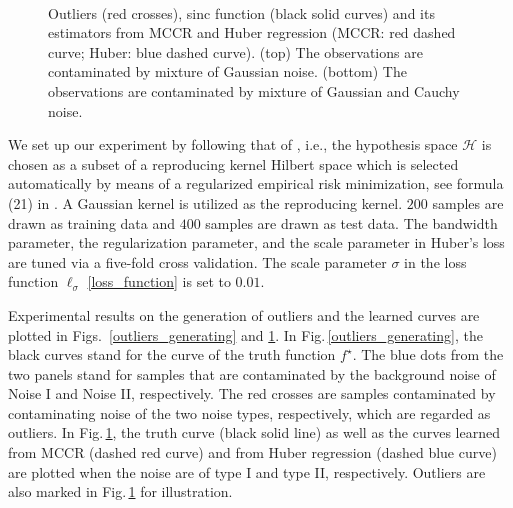 \documentclass[11pt]{article}
\begin{document}
\begin{figure}[!htb]
	\centering
	\begin{minipage}[b]{1\textwidth}
		\centering
		
	\end{minipage}%
	\\
	\medskip 
	\begin{minipage}[b]{1\textwidth}
		\centering
		
	\end{minipage}%
	\caption{Outliers (red crosses), sinc function (black solid curves) and its estimators from MCCR and Huber regression (MCCR: red  dashed curve; Huber: blue dashed curve). (top) The observations are contaminated by mixture of Gaussian noise. (bottom) The observations are contaminated by mixture of Gaussian and Cauchy noise.}
	\label{fitting_result}
\end{figure} 

 

We set up our experiment by following that of \cite{fenglearning}, i.e., the hypothesis space $\mathcal{H}$ is chosen as a subset of a reproducing kernel Hilbert space which is selected automatically by means of a regularized empirical risk minimization, see formula (21) in \cite{fenglearning}. A Gaussian kernel is utilized as the reproducing kernel. $200$ samples are drawn as training data and $400$ samples are drawn as test data. The bandwidth parameter, the regularization parameter, and the scale parameter in Huber's loss are tuned via a five-fold cross validation. The scale parameter $\sigma$ in the loss function $\ell_\sigma$ \eqref{loss_function} is set to $0.01$. 

Experimental results on the generation of outliers and the learned curves are plotted in Figs.\, \ref{outliers_generating} and \ref{fitting_result}. In Fig.\,\ref{outliers_generating}, the black curves stand for the curve of the truth function $f^\star$. The blue dots from the two panels stand for samples that are contaminated by the background noise of Noise I and Noise II, respectively. The red crosses are samples contaminated by contaminating noise of the two noise types, respectively, which are regarded as outliers. In Fig.\,\ref{fitting_result}, the truth curve (black solid line) as well as the curves learned from MCCR (dashed red curve) and from Huber regression (dashed blue curve) are plotted when the noise are of type I and type II, respectively. Outliers are also marked in Fig.\,\ref{fitting_result} for illustration. 
\end{document}
